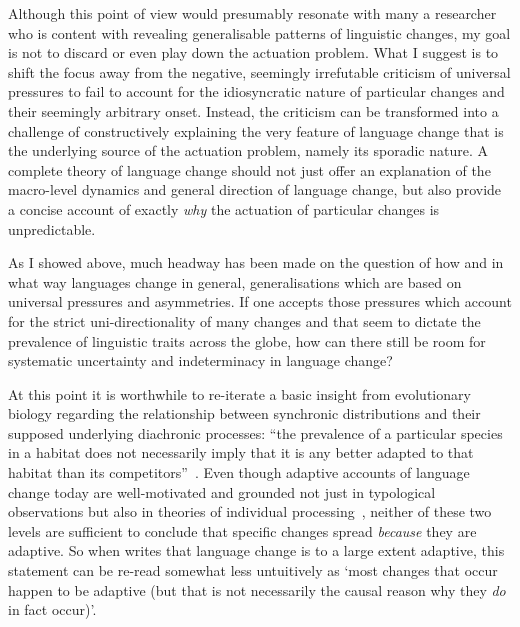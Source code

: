 Although this point of view would presumably resonate with many a researcher who is content with revealing generalisable patterns of linguistic changes, my goal is not to discard or even play down the actuation problem. 
What I suggest is to shift the focus away from the negative, seemingly irrefutable criticism of universal pressures to fail to account for the idiosyncratic nature of particular changes and their seemingly arbitrary onset. Instead, the criticism can be transformed into a challenge of constructively explaining the very feature of language change that is the underlying source of the actuation problem, namely its sporadic nature.
A complete theory of language change should not just offer an explanation of the macro-level dynamics and general direction of language change, but also provide a concise account of exactly \emph{why} the actuation of particular changes is unpredictable. %

As I showed above, much headway has been made on the question of how and in what way languages change in general, generalisations which are based on universal pressures and asymmetries. If one accepts those pressures which account for the strict uni-directionality of many changes and that seem to dictate the prevalence of linguistic traits across the globe, how can there still be room for systematic uncertainty and indeterminacy in language change?

At this point it is worthwhile to re-iterate a basic insight from evolutionary biology regarding the relationship between synchronic distributions and their supposed underlying diachronic processes: ``the prevalence of a particular species in a habitat does not necessarily imply that it is any better adapted to that habitat than its competitors''~\citep[p.2]{Blythe2012copying}.
Even though adaptive accounts of language change today are well-motivated and grounded not just in typological observations but also in theories of individual processing~\citep{Kirby1999,Jaeger2010}, neither of these two levels are sufficient to conclude that specific changes spread \emph{because} they are adaptive. So when \citet{Wichmann2015} writes that language change is to a large extent adaptive, this statement can be re-read somewhat less untuitively as `most changes that occur happen to be adaptive (but that is not necessarily the causal reason why they \emph{do} in fact occur)'.

